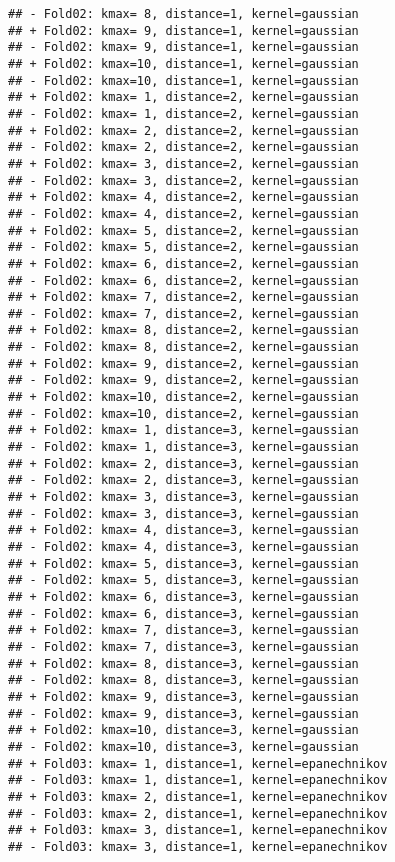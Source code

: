 \documentclass[
]{article}
\begin{document}
\begin{verbatim}
## - Fold02: kmax= 8, distance=1, kernel=gaussian 
## + Fold02: kmax= 9, distance=1, kernel=gaussian 
## - Fold02: kmax= 9, distance=1, kernel=gaussian 
## + Fold02: kmax=10, distance=1, kernel=gaussian 
## - Fold02: kmax=10, distance=1, kernel=gaussian 
## + Fold02: kmax= 1, distance=2, kernel=gaussian 
## - Fold02: kmax= 1, distance=2, kernel=gaussian 
## + Fold02: kmax= 2, distance=2, kernel=gaussian 
## - Fold02: kmax= 2, distance=2, kernel=gaussian 
## + Fold02: kmax= 3, distance=2, kernel=gaussian 
## - Fold02: kmax= 3, distance=2, kernel=gaussian 
## + Fold02: kmax= 4, distance=2, kernel=gaussian 
## - Fold02: kmax= 4, distance=2, kernel=gaussian 
## + Fold02: kmax= 5, distance=2, kernel=gaussian 
## - Fold02: kmax= 5, distance=2, kernel=gaussian 
## + Fold02: kmax= 6, distance=2, kernel=gaussian 
## - Fold02: kmax= 6, distance=2, kernel=gaussian 
## + Fold02: kmax= 7, distance=2, kernel=gaussian 
## - Fold02: kmax= 7, distance=2, kernel=gaussian 
## + Fold02: kmax= 8, distance=2, kernel=gaussian 
## - Fold02: kmax= 8, distance=2, kernel=gaussian 
## + Fold02: kmax= 9, distance=2, kernel=gaussian 
## - Fold02: kmax= 9, distance=2, kernel=gaussian 
## + Fold02: kmax=10, distance=2, kernel=gaussian 
## - Fold02: kmax=10, distance=2, kernel=gaussian 
## + Fold02: kmax= 1, distance=3, kernel=gaussian 
## - Fold02: kmax= 1, distance=3, kernel=gaussian 
## + Fold02: kmax= 2, distance=3, kernel=gaussian 
## - Fold02: kmax= 2, distance=3, kernel=gaussian 
## + Fold02: kmax= 3, distance=3, kernel=gaussian 
## - Fold02: kmax= 3, distance=3, kernel=gaussian 
## + Fold02: kmax= 4, distance=3, kernel=gaussian 
## - Fold02: kmax= 4, distance=3, kernel=gaussian 
## + Fold02: kmax= 5, distance=3, kernel=gaussian 
## - Fold02: kmax= 5, distance=3, kernel=gaussian 
## + Fold02: kmax= 6, distance=3, kernel=gaussian 
## - Fold02: kmax= 6, distance=3, kernel=gaussian 
## + Fold02: kmax= 7, distance=3, kernel=gaussian 
## - Fold02: kmax= 7, distance=3, kernel=gaussian 
## + Fold02: kmax= 8, distance=3, kernel=gaussian 
## - Fold02: kmax= 8, distance=3, kernel=gaussian 
## + Fold02: kmax= 9, distance=3, kernel=gaussian 
## - Fold02: kmax= 9, distance=3, kernel=gaussian 
## + Fold02: kmax=10, distance=3, kernel=gaussian 
## - Fold02: kmax=10, distance=3, kernel=gaussian 
## + Fold03: kmax= 1, distance=1, kernel=epanechnikov 
## - Fold03: kmax= 1, distance=1, kernel=epanechnikov 
## + Fold03: kmax= 2, distance=1, kernel=epanechnikov 
## - Fold03: kmax= 2, distance=1, kernel=epanechnikov 
## + Fold03: kmax= 3, distance=1, kernel=epanechnikov 
## - Fold03: kmax= 3, distance=1, kernel=epanechnikov 

\end{verbatim}
\end{document}
